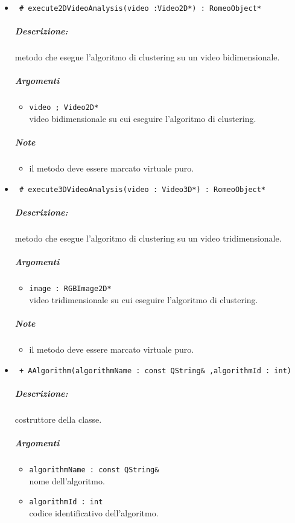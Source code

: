\begin{itemize}
		\item \color{blue}\verb! # execute2DVideoAnalysis(video :Video2D*) : RomeoObject* !\\
			\color{black}
			\subparagraph{Descrizione:} metodo che esegue l'algoritmo di clustering su un video bidimensionale.
			\subparagraph{Argomenti}
				\begin{itemize}
					\item \color{RoyalPurple}\verb!video ; Video2D* !\\
					\color{black} video bidimensionale su cui eseguire l'algoritmo di clustering.
				\end{itemize}
				\subparagraph{Note}
				\begin{itemize}
					\item il metodo deve essere marcato virtuale puro.
				\end{itemize}
		\item \color{blue}\verb! # execute3DVideoAnalysis(video : Video3D*) : RomeoObject* !\\
			\color{black}
			\subparagraph{Descrizione:} metodo che esegue l'algoritmo di clustering su un video tridimensionale.
			\subparagraph{Argomenti}
				\begin{itemize}
					\item \color{RoyalPurple}\verb!image : RGBImage2D*!\\
					\color{black} video tridimensionale su cui eseguire l'algoritmo di clustering.
				\end{itemize}
				\subparagraph{Note}
			\begin{itemize}
				\item il metodo deve essere marcato virtuale puro.
			\end{itemize}
			
		\item \color{blue}\verb! + AAlgorithm(algorithmName : const QString& ,algorithmId : int)!\\
			\color{black}
			\subparagraph{Descrizione:} costruttore della classe.
			\subparagraph{Argomenti}
				\begin{itemize}
					\item \color{RoyalPurple}\verb!algorithmName : const QString& !\\
					\color{black} nome dell'algoritmo.
					\item \color{RoyalPurple}\verb!algorithmId : int!\\
					\color{black} codice identificativo dell'algoritmo.
				\end{itemize}
			

\end{itemize}
